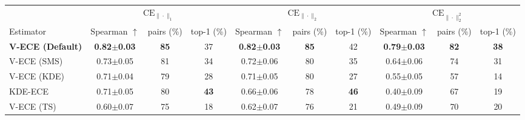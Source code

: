 \begin{tabular}{l ccc ccc ccc}
\toprule
& \multicolumn{3}{c}{$\mathrm{CE}_{\|\cdot\|_1}$} & \multicolumn{3}{c}{$\mathrm{CE}_{\|\cdot\|_2}$} & \multicolumn{3}{c}{$\mathrm{CE}_{\|\cdot\|_2^2}$} \\
\cmidrule(lr){2-4} \cmidrule(lr){5-7} \cmidrule(lr){8-10}
Estimator & Spearman $\uparrow$ & pairs (\%) & top-1 (\%) & Spearman $\uparrow$ & pairs (\%) & top-1 (\%) & Spearman $\uparrow$ & pairs (\%) & top-1 (\%) \\
\midrule
\textbf{V-ECE (Default)} & \textbf{0.82{\scriptsize$\pm$0.03}} & \textbf{85} & 37 & \textbf{0.82{\scriptsize$\pm$0.03}} & \textbf{85} & 42 & \textbf{0.79{\scriptsize$\pm$0.03}} & \textbf{82} & \textbf{38} \\
V-ECE (SMS) & 0.73{\scriptsize$\pm$0.05} & 81 & 34 & 0.72{\scriptsize$\pm$0.06} & 80 & 35 & 0.64{\scriptsize$\pm$0.06} & 74 & 31 \\
V-ECE (KDE) & 0.71{\scriptsize$\pm$0.04} & 79 & 28 & 0.71{\scriptsize$\pm$0.05} & 80 & 27 & 0.55{\scriptsize$\pm$0.05} & 57 & 14 \\
KDE-ECE & 0.71{\scriptsize$\pm$0.05} & 80 & \textbf{43} & 0.66{\scriptsize$\pm$0.06} & 78 & \textbf{46} & 0.40{\scriptsize$\pm$0.09} & 67 & 19 \\
V-ECE (TS) & 0.60{\scriptsize$\pm$0.07} & 75 & 18 & 0.62{\scriptsize$\pm$0.07} & 76 & 21 & 0.49{\scriptsize$\pm$0.09} & 70 & 20 \\
\bottomrule
\end{tabular}

